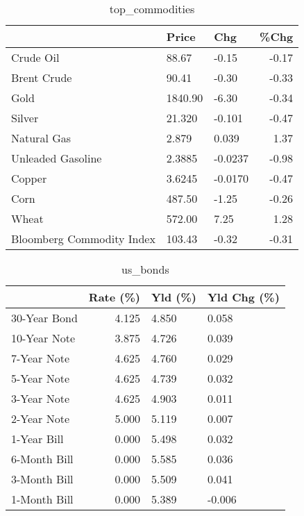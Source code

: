 \documentclass{article}%
\begin{document}
\begin{table}[htbp]%
\caption{top\_commodities}%
\centering%
\begin{adjustbox}{width=1\textwidth}%
\begin{tabular}{lllr}
\toprule
                          &   Price &     Chg &  \%Chg \\
\midrule
               Crude Oil  &   88.67 &   -0.15 & -0.17 \\
             Brent Crude  &   90.41 &   -0.30 & -0.33 \\
                    Gold  & 1840.90 &   -6.30 & -0.34 \\
                  Silver  &  21.320 &  -0.101 & -0.47 \\
             Natural Gas  &   2.879 &   0.039 &  1.37 \\
       Unleaded Gasoline  &  2.3885 & -0.0237 & -0.98 \\
                  Copper  &  3.6245 & -0.0170 & -0.47 \\
                    Corn  &  487.50 &   -1.25 & -0.26 \\
                   Wheat  &  572.00 &    7.25 &  1.28 \\
Bloomberg Commodity Index &  103.43 &   -0.32 & -0.31 \\
\bottomrule
\end{tabular}
%
\end{adjustbox}%
\end{table}

%


\begin{table}[htbp]%
\caption{us\_bonds}%
\centering%
\begin{adjustbox}{width=1\textwidth}%
\begin{tabular}{lrll}
\toprule
             &  Rate (\%) & Yld (\%) & Yld Chg (\%) \\
\midrule
30-Year Bond &     4.125 &   4.850 &       0.058 \\
10-Year Note &     3.875 &   4.726 &       0.039 \\
 7-Year Note &     4.625 &   4.760 &       0.029 \\
 5-Year Note &     4.625 &   4.739 &       0.032 \\
 3-Year Note &     4.625 &   4.903 &       0.011 \\
 2-Year Note &     5.000 &   5.119 &       0.007 \\
 1-Year Bill &     0.000 &   5.498 &       0.032 \\
6-Month Bill &     0.000 &   5.585 &       0.036 \\
3-Month Bill &     0.000 &   5.509 &       0.041 \\
1-Month Bill &     0.000 &   5.389 &      -0.006 \\
\bottomrule
\end{tabular}
%
\end{adjustbox}%
\end{table}
\end{document}
